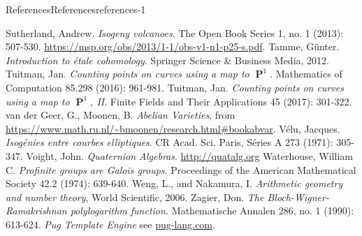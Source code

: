 \documentclass[oneside,10pt,]{book}
\numberwithin{equation}{section}
\DeclareMathOperator{\PP}{\mathbf{P}}
\begin{document}
\begin{references-chapter-numberless}{References}{}{References}{}{}{references-1}
\begin{thebibliography}{9}
\hypertarget{bib-sutherland}{}Sutherland, Andrew. \textit{Isogeny volcanoes}. The Open Book Series 1, no. 1 (2013): 507-530. \url{https://msp.org/obs/2013/1-1/obs-v1-n1-p25-s.pdf}.
\hypertarget{bib-tamme}{}Tamme, Günter. \textit{Introduction to étale cohomology}. Springer Science \& Business Media, 2012.
\hypertarget{bib-tuitman-map-to-p1-1}{}Tuitman, Jan. \textit{Counting points on curves using a map to \(\PP^1\)}. Mathematics of Computation 85.298 (2016): 961-981.
\hypertarget{bib-tuitman-map-to-p1-2}{}Tuitman, Jan. \textit{Counting points on curves using a map to \(\PP^1\), II}. Finite Fields and Their Applications 45 (2017): 301-322.
\hypertarget{bib-vandergeer-moonen}{}van der Geer, G., Moonen, B. \textit{Abelian Varieties}, from \url{https://www.math.ru.nl/\~bmoonen/research.html\#bookabvar}.
\hypertarget{bib-velu}{}Vélu, Jacques. \textit{Isogénies entre courbes elliptiques}. CR Acad. Sci. Paris, Séries A 273 (1971): 305-347.
\hypertarget{bib-voight-quat}{}Voight, John. \textit{Quaternion Algebras}. \url{http://quatalg.org}
\hypertarget{bib-waterhouse}{}Waterhouse, William C.  \textit{Profinite groups are Galois groups}. Proceedings of the American Mathematical Society 42.2 (1974): 639-640.
\hypertarget{bib-weng-nakamura}{}Weng, L., and Nakamura, I. \textit{Arithmetic geometry and number theory}, World Scientific, 2006.
\hypertarget{bib-zag-ram}{}Zagier, Don.  \textit{The Bloch-Wigner-Ramakrishnan polylogarithm function.} Mathematische Annalen 286, no. 1 (1990): 613-624.
\hypertarget{bib-pug}{}\textit{Pug Template Engine} see \href{http://pug-lang.com/}{pug-lang.com}.
\end{thebibliography}
\end{references-chapter-numberless}
\end{document}
